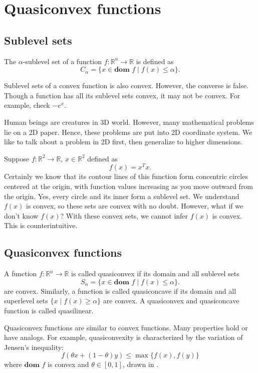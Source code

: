 \documentclass[lang=en,color=blue,mode=fancy,titlestyle=hang]{elegantbook}
\begin{document}
\section{Quasiconvex functions}
\subsection{Sublevel sets}

The $\alpha$-sublevel set of a function $f: \mathbb{R}^n \rightarrow \mathbb{R}$ is defined
as
\[
C_{\alpha} = \{ x \in \textbf{dom } f\;|\; f(x) \leq \alpha \}.
\]

Sublevel sets of a convex function is also convex. However, the converse is false. Though
a function has all its sublevel sets convex, it may not be convex. For example, check $-e^x$.

Human beings are creatures in 3D world. However, many mathematical problems lie on a 2D
paper. Hence, these problems are put into 2D coordinate system. We like to talk about
a problem in 2D first, then generalize to higher dimensions. 

Suppose $f: \mathbb{R}^2 \rightarrow \mathbb{R}$, $x \in \mathbb{R}^2$ defined as
\[
f(x) = x^T x.
\]
Certainly we know that its contour lines of this function form concentric circles
centered at the origin, with function values increasing as you move outward from the
origin. Yes, every circle and its inner form a sublevel set. We understand $f(x)$ is
convex, so these sets are convex with no doubt. However, what if we don't know $f(x)$?
With these convex sets, we cannot infer $f(x)$ is convex. This is counterintuitive.

\subsection{Quasiconvex functions}

A function $f: \mathbb{R}^n \rightarrow \mathbb{R}$ is called quasiconvex if its domain
and all sublevel sets
\[
S_{\alpha} = \{ x \in \textbf{dom } f\;|\; f(x) \leq \alpha \}.
\]
are convex. Similarly, a function is called quasiconcave if its domain and all superlevel
sets $\{ x \;|\; f(x) \geq \alpha \}$ are convex. A quasiconvex and quasiconcave function
is called quasilinear.

Quasiconvex functions are similar to convex functions. Many properties hold or have analogs.
For example, quasiconvexity is characterized by the variation of Jensen's inequality:
\[
f(\theta x + (1 - \theta) y) \leq \max\{ f(x), f(y) \}
\]
where $\textbf{dom } f$ is convex and $\theta \in [0, 1]$, drawn in .
\end{document}
